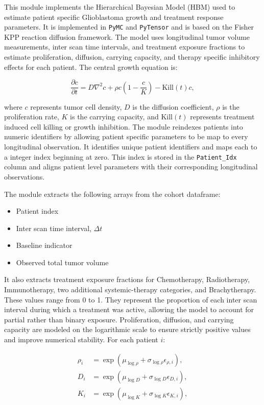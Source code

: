 This module implements the Hierarchical Bayesian Model (HBM) used to estimate patient specific Glioblastoma growth and treatment response parameters. It is implemented in \texttt{PyMC} and \texttt{PyTensor} and is based on the Fisher KPP reaction diffusion framework. The model uses longitudinal tumor volume measurements, inter scan time intervals, and treatment exposure fractions to estimate proliferation, diffusion, carrying capacity, and therapy specific inhibitory effects for each patient. The central growth equation is:

\begin{equation}
\frac{\partial c}{\partial t}
=
D\nabla^{2}c
+
\rho c\left(1-\frac{c}{K}\right)
-
\mathrm{Kill}(t)c,
\end{equation}

where $c$ represents tumor cell density, $D$ is the diffusion coefficient, $\rho$ is the proliferation rate, $K$ is the carrying capacity, and $\mathrm{Kill}(t)$ represents treatment induced cell killing or growth inhibition. The module reindexes patients into numeric identifiers by allowing patient specific parameters to be map to every longitudinal observation. It identifies unique patient identifiers and maps each to a integer index beginning at zero. This index is stored in the \texttt{Patient\_Idx} column and aligns patient level parameters with their corresponding longitudinal observations.

The module extracts the following arrays from the cohort dataframe:

\begin{itemize}
    \item Patient index
    \item Inter scan time interval, $\Delta t$
    \item Baseline indicator
    \item Observed total tumor volume
\end{itemize}

It also extracts treatment exposure fractions for Chemotherapy, Radiotherapy, Immunotherapy, two additional systemic-therapy categories, and Brachytherapy. These values range from 0 to 1. They represent the proportion of each inter scan interval during which a treatment was active, allowing the model to account for partial rather than binary exposure. Proliferation, diffusion, and carrying capacity are modeled on the logarithmic scale to ensure strictly positive values and improve numerical stability. For each patient $i$:

\begin{align}
\rho_i &= \exp\left(\mu_{\log \rho}+\sigma_{\log \rho}\epsilon_{\rho,i}\right), \\
D_i &= \exp\left(\mu_{\log D}+\sigma_{\log D}\epsilon_{D,i}\right), \\
K_i &= \exp\left(\mu_{\log K}+\sigma_{\log K}\epsilon_{K,i}\right),
\end{align}

